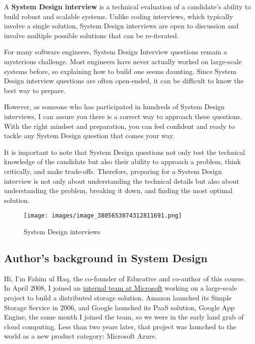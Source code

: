 

A \textbf{System Design interview} is a technical evaluation of a candidate's ability to build robust and scalable systems. Unlike coding interviews, which typically involve a single solution, System Design interviews are open to discussion and involve multiple possible solutions that can be re-iterated.

For many software engineers, System Design Interview questions remain a mysterious challenge. Most engineers have never actually worked on large-scale systems before, so explaining how to build one seems daunting. Since System Design interview questions are often open-ended, it can be difficult to know the best way to prepare.

However, as someone who has participated in hundreds of System Design interviews, I can assure you there is a correct way to approach these questions. With the right mindset and preparation, you can feel confident and ready to tackle any System Design question that comes your way.

It is important to note that System Design questions not only test the technical knowledge of the candidate but also their ability to approach a problem, think critically, and make trade-offs. Therefore, preparing for a System Design interview is not only about understanding the technical details but also about understanding the problem, breaking it down, and finding the most optimal solution.

\begin{figure}[htbp]
 \centering
 \texttt{[image: images/image\_3805653074312811691.png]}
 \caption{System Design interviews}
\end{figure}

\subsection{Author's background in System Design}\label{gIyZLoEnzqAWz9PwuDQ-5}

Hi, I'm Fahim ul Haq, the co-founder of Educative and co-author of this course. In April 2008, I joined an \href{https://www.educative.io/blog/25-years-of-developer-interviews}{internal team at Microsoft} working on a large-scale project to build a distributed storage solution. Amazon launched its Simple Storage Service in 2006, and Google launched its PaaS solution, Google App Engine, the same month I joined the team, so we were in the early land grab of cloud computing. Less than two years later, that project was launched to the world as a new product category: Microsoft Azure.

